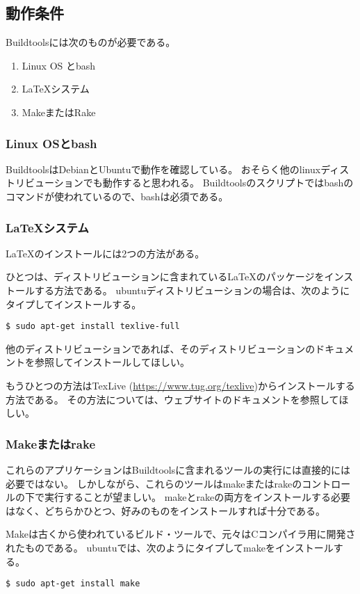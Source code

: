 \subsection{動作条件}
Buildtoolsには次のものが必要である。
\begin{enumerate}
\item Linux OS とbash
\item LaTeXシステム
\item MakeまたはRake
\end{enumerate}

\subsubsection{Linux OSとbash}
BuildtoolsはDebianとUbuntuで動作を確認している。
おそらく他のlinuxディストリビューションでも動作すると思われる。
Buildtoolsのスクリプトではbashのコマンドが使われているので、bashは必須である。
\subsubsection{LaTeXシステム}
LaTeXのインストールには2つの方法がある。

ひとつは、ディストリビューションに含まれているLaTeXのパッケージをインストールする方法である。
ubuntuディストリビューションの場合は、次のようにタイプしてインストールする。
\begin{verbatim}
$ sudo apt-get install texlive-full
\end{verbatim}
他のディストリビューションであれば、そのディストリビューションのドキュメントを参照してインストールしてほしい。

もうひとつの方法はTexLive (\url{https://www.tug.org/texlive})からインストールする方法である。
その方法については、ウェブサイトのドキュメントを参照してほしい。

\subsubsection{Makeまたはrake}
これらのアプリケーションはBuildtoolsに含まれるツールの実行には直接的には必要ではない。
しかしながら、これらのツールはmakeまたはrakeのコントロールの下で実行することが望ましい。
makeとrakeの両方をインストールする必要はなく、どちらかひとつ、好みのものをインストールすれば十分である。

Makeは古くから使われているビルド・ツールで、元々はCコンパイラ用に開発されたものである。
ubuntuでは、次のようにタイプしてmakeをインストールする。
\begin{verbatim}
$ sudo apt-get install make
\end{verbatim}

